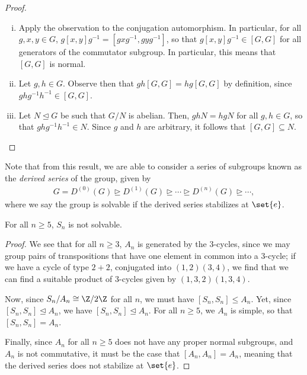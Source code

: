 \documentclass[10pt]{mypackage}
\begin{document}
\begin{proof}\hfill
  \begin{enumerate}[(i)]
    \item Apply the observation to the conjugation automorphism. In particular, for all $g,x,y\in G$, $g\left[ x,y \right]g^{-1} = \left[ gxg^{-1},gyg^{-1} \right]$, so that $g\left[ x,y \right]g^{-1}\in \left[ G,G \right]$ for all generators of the commutator subgroup. In particular, this means that $\left[ G,G \right]$ is normal.
    \item Let $g,h\in G$. Observe then that $gh\left[ G,G \right] = hg\left[ G,G \right]$ by definition, since $ghg^{-1}h^{-1}\in \left[ G,G \right]$.
    \item Let $N\trianglelefteq G$ be such that $G/N$ is abelian. Then, $ghN = hgN$ for all $g,h\in G$, so that $ghg^{-1}h^{-1}\in N$. Since $g$ and $h$ are arbitrary, it follows that $ \left[ G,G \right]\subseteq N $.
  \end{enumerate}
\end{proof}
Note that from this result, we are able to consider a series of subgroups known as the \textit{derived series} of the group, given by
\begin{align*}
  G = D^{(0)}(G) \trianglerighteq D^{(1)}(G)\trianglerighteq\cdots\trianglerighteq D^{(n)}(G)\trianglerighteq\cdots,
\end{align*}
where we say the group is solvable if the derived series stabilizes at $\set{e}$.
\begin{theorem}
  For all $n\geq 5$, $S_n$ is not solvable.
\end{theorem}
\begin{proof}
  We see that for all $n\geq 3$, $A_n$ is generated by the $3$-cycles, since we may group pairs of transpositions that have one element in common into a $3$-cycle; if we have a cycle of type $2+2$, conjugated into $\left( 1,2 \right)\left( 3,4 \right)$, we find that we can find a suitable product of $3$-cycles given by $\left( 1,3,2 \right)\left( 1,3,4 \right)$.%

Now, since $S_n/A_n\cong \Z/2\Z$ for all $n$, we must have $ \left[ S_n,S_n \right]\leq A_n $. Yet, since $ \left[ S_n,S_n \right]\trianglelefteq A_n $, we have $ \left[ S_n,S_n \right]\trianglelefteq A_n $. For all $n\geq 5$, we $A_n$ is simple, so that $\left[ S_n,S_n \right] = A_n$.%

Finally, since $A_n$ for all $n\geq 5$ does not have any proper normal subgroups, and $A_n$ is not commutative, it must be the case that $\left[ A_n,A_n \right] = A_n$, meaning that the derived series does not stabilize at $\set{e}$.
\end{proof}
\end{document}
